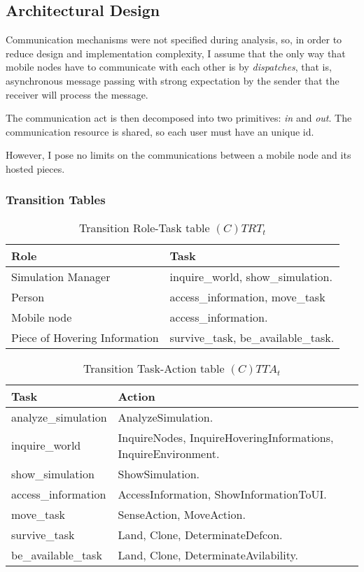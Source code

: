 \subsection{Architectural Design}

Communication mechanisms were not specified during analysis, so, in order to
reduce design and implementation complexity, I assume that the only way that
mobile nodes have to communicate with each other is by \emph{dispatches}, that
is, asynchronous message passing with strong expectation by the sender that the
receiver will process the message.

The communication act is then decomposed into two primitives: \emph{in} and
\emph{out}. The communication resource is shared, so each user must have an
unique id.

However, I pose no limits on the communications between a mobile node and its
hosted pieces.

\subsubsection{Transition Tables}

\begin{table}[H]
	\centering
	\begin{tabular}{|p{4cm}|p{8cm}|}
			\hline
			\textbf{Role} & \textbf{Task} \\
			\hline
      Simulation Manager & inquire\_world, show\_simulation.   \\
			\hline
			Person & access\_information, move\_task \\
			\hline
			Mobile node & access\_information.  \\
			\hline
			Piece of Hovering Information & survive\_task, be\_available\_task. \\
			\hline
		\end{tabular}
	\caption{Transition Role-Task table $(C)TRT_t$}
	\label{tab:ctrtt}
\end{table}

\begin{table}[H]
	\centering
	\begin{tabular}{|p{4cm}|p{8cm}|}
			\hline
			\textbf{Task} & \textbf{Action} \\
			\hline
			analyze\_simulation & AnalyzeSimulation. \\
			\hline
			inquire\_world & InquireNodes, InquireHoveringInformations, InquireEnvironment. \\
			\hline
			show\_simulation & ShowSimulation. \\
			\hline
			access\_information & AccessInformation, ShowInformationToUI.\\
			\hline
			move\_task & SenseAction, MoveAction. \\
			\hline
			survive\_task & Land, Clone, DeterminateDefcon. \\
			\hline
			be\_available\_task & Land, Clone, DeterminateAvilability. \\
			\hline
		\end{tabular}
	\caption{Transition Task-Action table $(C)TTA_t$}
	\label{tab:cttat}
\end{table}


